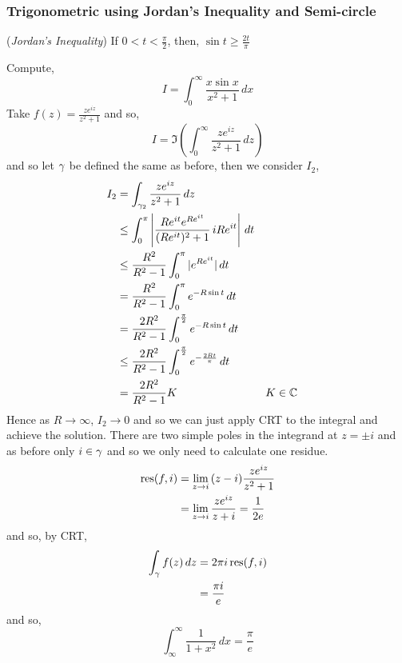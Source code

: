 \documentclass{article}
\begin{document}
\subsubsection{Trigonometric using Jordan's Inequality and Semi-circle}

\begin{nlemma}{(\textit{Jordan's Inequality})}
  If $0 < t < \frac{\pi}{2}$, then, $\sin t \ge \frac{2t}{\pi}$
\end{nlemma}

\begin{eg}
  Compute,
  $$ I = \int_{0}^\infty {\frac{x\sin x}{x^2 + 1}}\,dx $$
  Take $\displaystyle{f(z) = \frac{ze^{iz}}{z^2 + 1}}$ and so,
  $$ I = \Im \left( \int_{0}^\infty \frac{ze^{iz}}{z^2 + 1}\,dz \right) $$
  and so let $\gamma$ be defined the same as before, then we consider $I_2$,
  \begin{align*}
    I_2 &= \int_{\gamma_2} \frac{ze^{iz}}{z^2 + 1}\,dz\\
    &\le \int_0^\pi \left |\frac{Re^{it} e^{Re^{it}}}{(Re^{it})^2 + 1}\,iRe^{it}\right |\,dt \\
    &\le \frac{R^2}{R^2-1}\int_0^\pi |e^{Re^{it}}|\,dt\\
    &= \frac{R^2}{R^2-1}\int_0^\pi e^{-R\sin t}\,dt\\
    &= \frac{2R^2}{R^2-1}\int_0^{\frac{\pi}{2}} e^{-R\sin t}\,dt\\
    &\le \frac{2R^2}{R^2-1}\int_0^{\frac{\pi}{2}} e^{-\frac{2Rt}{\pi}}\,dt\\
    &= \frac{2R^2}{R^2-1}K && \text{$K \in \mathbb{C}$}
  \end{align*}
  Hence as $R \to \infty$, $I_2 \to 0$ and so we can just apply CRT to the integral and achieve the solution. There are two simple poles in the integrand at $z = \pm i$ and as before only $i \in \gamma$ and so we only need to calculate one residue.
  \begin{align*}
    \operatorname*{res} (f, i) &= \lim_{z \to i} {(z - i) \frac{ze^{iz}}{z^2 + 1}}\\
    &= \lim_{z \to i} {\frac{ze^{iz}}{z + i}} = \frac{1}{2e}\\
  \end{align*}
  and so, by CRT,
  \begin{align*}
    \int_\gamma f(z)\,dz &= 2\pi i \operatorname*{res}(f, i)\\&= \frac{\pi i}{e}
  \end{align*}
  and so,
  $$ \int_{\infty}^\infty \frac{1}{1 + x^2}\,dx = \frac{\pi}{e} $$
\end{eg}
\end{document}
